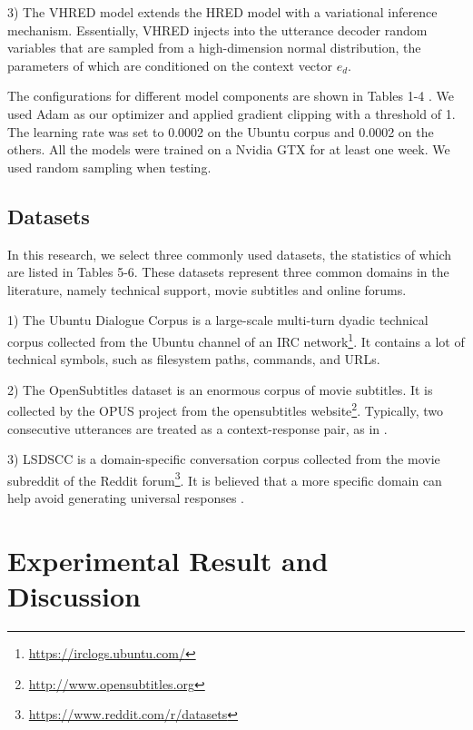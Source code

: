 \documentclass[conference]{IEEEtran}
\begin{document}
    3) The VHRED model \cite{VHRED} extends the HRED model with a variational inference mechanism. Essentially, VHRED injects into the utterance decoder random variables that are sampled from a high-dimension normal distribution, the parameters of which are conditioned on the context vector $e_d$.

    The configurations for different model components are shown in Tables 1-4 . We used Adam \cite{AdamOpt} as our optimizer and applied gradient clipping with a threshold of 1. The learning rate was set to 0.0002 on the Ubuntu corpus and 0.0002 on the others. All the models were trained on a Nvidia GTX for at least one week. We used random sampling when testing.
    

    \subsection{Datasets}
    In this research, we select three commonly used datasets, the statistics of which are listed in Tables 5-6. These datasets represent three common domains in the literature, namely technical support, movie subtitles and online forums.
    

    1) The Ubuntu Dialogue Corpus \cite{ubuntu_corpus} is a large-scale multi-turn dyadic technical corpus collected from the Ubuntu channel of an IRC network\footnote{\url{https://irclogs.ubuntu.com/}}. It contains a lot of technical symbols, such as filesystem paths, commands, and URLs.

    2) The OpenSubtitles dataset \cite{opensub} is an enormous corpus of movie subtitles. It is collected by the OPUS project \cite{OPUS} from the opensubtitles website\footnote{\url{http://www.opensubtitles.org}}. Typically, two consecutive utterances are treated as a context-response pair, as in \cite{GoogleChatbot,MMI}.

    3) LSDSCC \cite{LSDSCC} is a domain-specific conversation corpus collected from the movie subreddit of the Reddit forum\footnote{\url{https://www.reddit.com/r/datasets}}. It is believed that a more specific domain can help avoid generating universal responses \cite{LSDSCC}.


\section{Experimental Result and Discussion}
\end{document}
